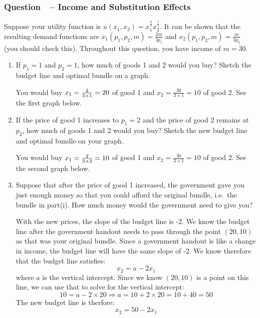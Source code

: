 \documentclass[12pt]{article}
\newcounter{question}[section]
\newcommand{\question}[1]{\refstepcounter{question}
  \subsubsection*{Question~\thequestion~-- #1}}
\newenvironment{subquestions}{
  \begin{enumerate}[label=(\roman*)]}{\end{enumerate}}
\begin{document}
\question{Income and Substitution Effects}
Suppose your utility function is $u\left( x_1,x_2 \right)=x_1^{\frac{2}{3}}x_2^{\frac{1}{3}}$. It can be shown that the resulting demand functions are $x_1\left( p_1,p_2,m \right)=\frac{2m}{3p_1}$ and $x_2\left( p_1,p_2,m \right)=\frac{m}{3p_2}$ (you should check this). Throughout this question, you have income of $m=30$.
\begin{subquestions}
  \item If $p_1=1$ and $p_2=1$, how much of goods 1 and 2 would you buy? Sketch the budget line and optimal bundle on a graph.
  \par\textcolor{solution-color}{
    You would buy $x_1=\frac{2\time 30}{3\times 1}=20$ of good 1 and $x_2=\frac{30}{3\times 1}=10$ of good 2. See the first graph below.
  }
  \item If the price of good 1 increases to $p_1=2$ and the price of good 2 remains at $p_2$, how much of goods 1 and 2 would you buy? Sketch the new budget line and optimal bundle on your graph.
  \par\textcolor{solution-color}{
    You would buy $x_1=\frac{2\time 30}{3\times 2}=10$ of good 1 and $x_2=\frac{30}{3\times 1}=10$ of good 2. See the second graph below.
  }
  \item Suppose that after the price of good 1 increased, the government gave you just enough money so that you could afford the original bundle, i.e.~the bundle in part(i). How much money would the government need to give you?
  \par\textcolor{solution-color}{
    With the new prices, the slope of the budget line is -2. We know the budget line after the government handout needs to pass through the point $\left( 20,10 \right)$ as that was your original bundle. Since a government handout is like a change in income, the budget line will have the same slope of -2. We know therefore that the budget line satisfies:
    \begin{equation*}
      x_2 = a - 2 x_1
    \end{equation*}
    where $a$ is the vertical intercept. Since we know $\left( 20,10 \right)$ is a point on this line, we can use that to solve for the vertical intercept:
    \begin{equation*}
      10=a-2\times 20 \Longrightarrow a = 10+2\times 20 = 10+40 = 50
    \end{equation*}
    The new budget line is therfore:
    \begin{equation*}
      x_2 = 50 - 2x_1
    \end{equation*}
}
\end{subquestions}
\end{document}

